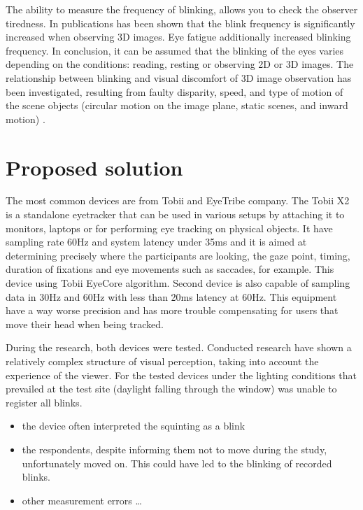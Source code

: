\documentclass[runningheads,a4paper]{llncs}
\begin{document}
The ability to measure the frequency of blinking, allows you to check the observer tiredness. In publications \cite{5606312, 6211573} has been shown that the blink frequency is significantly increased when observing 3D images. Eye fatigue additionally increased blinking frequency. In conclusion, it can be assumed that the blinking of the eyes varies depending on the conditions: reading, resting or observing 2D or 3D images. The relationship between blinking and visual discomfort of 3D image observation has been investigated, resulting from faulty disparity, speed, and type of motion of the scene objects (circular motion on the image plane, static scenes, and inward motion) \cite{00789026}. 

\section{Proposed solution}
The most common devices are from Tobii and EyeTribe company. 
The Tobii X2 is a standalone eyetracker that can be used in various setups by attaching it to monitors, laptops or for performing eye tracking on physical objects. It have sampling rate 60Hz and system latency under 35ms and it is aimed at determining precisely where the participants are looking, the gaze point, timing, duration of fixations and eye movements such as saccades, for example. This device using Tobii EyeCore algorithm. 
Second device is also capable of sampling data in 30Hz and 60Hz with less than 20ms latency at 60Hz. This equipment have a way worse precision and has more trouble compensating for users that move their head when being tracked. 

During the research, both devices were tested.
Conducted research have shown a relatively complex structure of visual perception, taking into account the experience of the viewer.
For the tested devices under the lighting conditions that prevailed at the test site (daylight falling through the window) was unable to register all blinks.

\begin{itemize}
  \item the device often interpreted the squinting as a blink
  \item the respondents, despite informing them not to move during the study, unfortunately moved on. This could have led to the blinking of recorded blinks.
  \item other measurement errors \ldots
\end{itemize}
\end{document}
